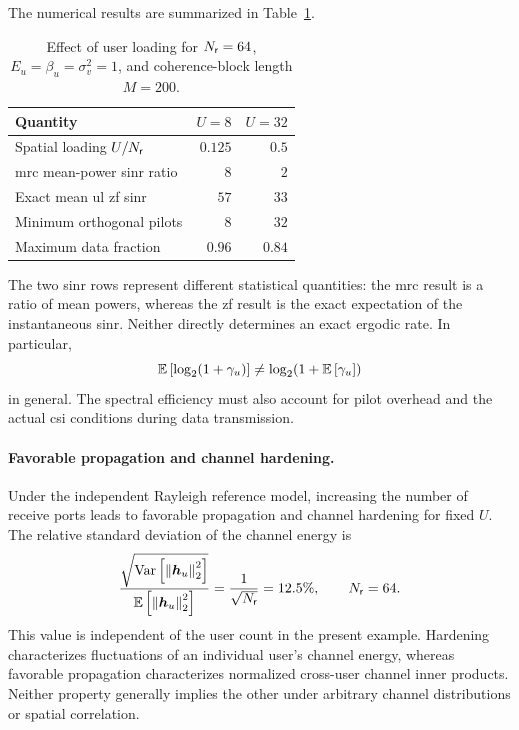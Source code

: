 The numerical results are summarized in Table~\ref{tab06:massive-comparison}.
\begin{table}[htbp]
	\centering
	\caption{Effect of user loading for $N_{\mathsf{r}}=64$, $E_u=\beta_u=\sigma_v^2=1$, and coherence-block length $M=200$.}
	\label{tab06:massive-comparison}
	\begin{tabular}{lrr}
		\toprule
		Quantity & $U=8$ & $U=32$\\
		\midrule
		Spatial loading $U/N_{\mathsf{r}}$ & $0.125$ & $0.5$\\
		\ac{mrc} mean-power \ac{sinr} ratio & $8$ & $2$\\
		Exact mean \ac{ul} \ac{zf} \ac{sinr} & $57$ & $33$\\
		Minimum orthogonal pilots & $8$ & $32$\\
		Maximum data fraction & $0.96$ & $0.84$\\
		\bottomrule
	\end{tabular}
\end{table}
The two \ac{sinr} rows represent different statistical quantities: the \ac{mrc} result is a ratio of mean powers, whereas the \ac{zf} result is the exact expectation of the instantaneous \ac{sinr}. Neither directly determines an exact ergodic rate. In particular,
\begin{equation*}
	\mathbb{E}\left[\log_2(1+\gamma_u)\right]
	\ne\log_2(1+\mathbb{E}\left[\gamma_u\right])
\end{equation*}
in general. The spectral efficiency must also account for pilot overhead and the actual \ac{csi} conditions during data transmission.

\paragraph{Favorable propagation and channel hardening.}
Under the independent Rayleigh reference model, increasing the number of receive ports leads to favorable propagation and channel hardening for fixed $U$. The relative standard deviation of the channel energy is
\begin{equation*}
	\frac{\sqrt{\operatorname{Var}\left[\left\|\bm{h}_u\right\|_2^2\right]}}
	{\mathbb{E}\left[\left\|\bm{h}_u\right\|_2^2\right]}
	=\frac1{\sqrt{N_{\mathsf{r}}}}
	=12.5\%,\qquad N_{\mathsf{r}}=64.
\end{equation*}
This value is independent of the user count in the present example. Hardening characterizes fluctuations of an individual user's channel energy, whereas favorable propagation characterizes normalized cross-user channel inner products. Neither property generally implies the other under arbitrary channel distributions or spatial correlation.

